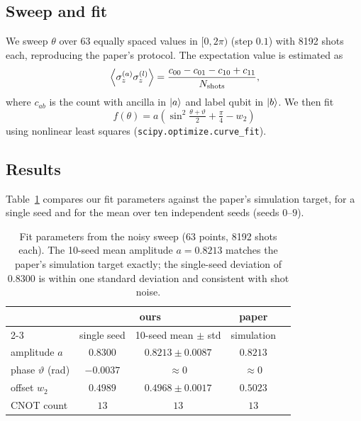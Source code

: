 \documentclass[11pt,a4paper]{article}
\begin{document}
\subsection{Sweep and fit}

We sweep $\theta$ over 63 equally spaced values in $[0, 2\pi)$ (step $0.1$)
with 8192 shots each, reproducing the paper's protocol. The expectation
value is estimated as
\begin{equation}
  \expval{\sigma_z^{(a)}\sigma_z^{(l)}}
  = \frac{c_{00} - c_{01} - c_{10} + c_{11}}{N_{\text{shots}}},
\end{equation}
where $c_{ab}$ is the count with ancilla in $\ket{a}$ and label qubit in
$\ket{b}$. We then fit
\begin{equation}
  f(\theta) = a\!\left(\sin^2\!\tfrac{\theta + \vartheta}{2} + \tfrac{\pi}{4}
              - w_2\right)
\end{equation}
using nonlinear least squares (\texttt{scipy.optimize.curve\_fit}).

\subsection{Results}

Table~\ref{tab:noise-results} compares our fit parameters against the
paper's simulation target, for a single seed and for the mean over ten
independent seeds (seeds $0$--$9$).

\begin{table}[h]
\centering
\begin{tabular}{lcccc}
  \toprule
  & \multicolumn{2}{c}{ours} & paper \\
  \cmidrule(lr){2-3}
  & single seed & 10-seed mean $\pm$ std & simulation \\
  \midrule
  amplitude $a$          & $0.8300$ & $0.8213 \pm 0.0087$ & $0.8213$ \\
  phase $\vartheta$ (rad) & $-0.0037$ & $\approx 0$        & $\approx 0$ \\
  offset $w_2$           & $0.4989$ & $0.4968 \pm 0.0017$ & $0.5023$ \\
  CNOT count             & $13$     & $13$                & $13$ \\
  \bottomrule
\end{tabular}
\caption{Fit parameters from the noisy sweep (63 points, 8192 shots each).
The 10-seed mean amplitude $a = 0.8213$ matches the paper's simulation target
exactly; the single-seed deviation of $0.8300$ is within one standard
deviation and consistent with shot noise.}
\label{tab:noise-results}
\end{table}
\end{document}
